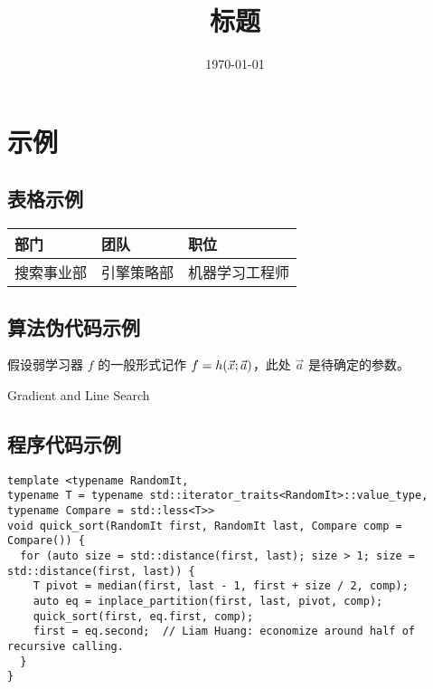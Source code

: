 \documentclass[UTF8, zihao = 5, draft]{article}
\title{标题}
\author{\authorname}
\date{\today}
\begin{document}
\makefrontpage
{}  %

\section{示例}
\subsection{表格示例}

\begin{tabu} to \linewidth{X[1,c]X[2,c]X[1.5,c]}
\toprule
部门 & 团队 & 职位 \\
\midrule
搜索事业部 & 引擎策略部 & 机器学习工程师 \\
\bottomrule
\end{tabu}

\clp  %

\subsection{算法伪代码示例}

假设弱学习器 $f$ 的一般形式记作 $f = h(\vec{x}; \vec a)$，此处 $\vec a$ 是待确定的参数。

\begin{algorithm}[!htbp]
  \scriptsize
  \caption{Gradient and Line Search}\label{alg:GALS}
  \begin{algorithmic}[1]
      \EndFor
    \EndProcedure
  \end{algorithmic}
\end{algorithm}

\clp  %

\subsection{程序代码示例}

\begin{lstlisting}[style = lcpp, caption = {快速排序主函数}]
template <typename RandomIt,
typename T = typename std::iterator_traits<RandomIt>::value_type,
typename Compare = std::less<T>>
void quick_sort(RandomIt first, RandomIt last, Compare comp = Compare()) {
  for (auto size = std::distance(first, last); size > 1; size = std::distance(first, last)) {
    T pivot = median(first, last - 1, first + size / 2, comp);
    auto eq = inplace_partition(first, last, pivot, comp);
    quick_sort(first, eq.first, comp);
    first = eq.second;  // Liam Huang: economize around half of recursive calling.
  }
}
\end{lstlisting}
\end{document}

